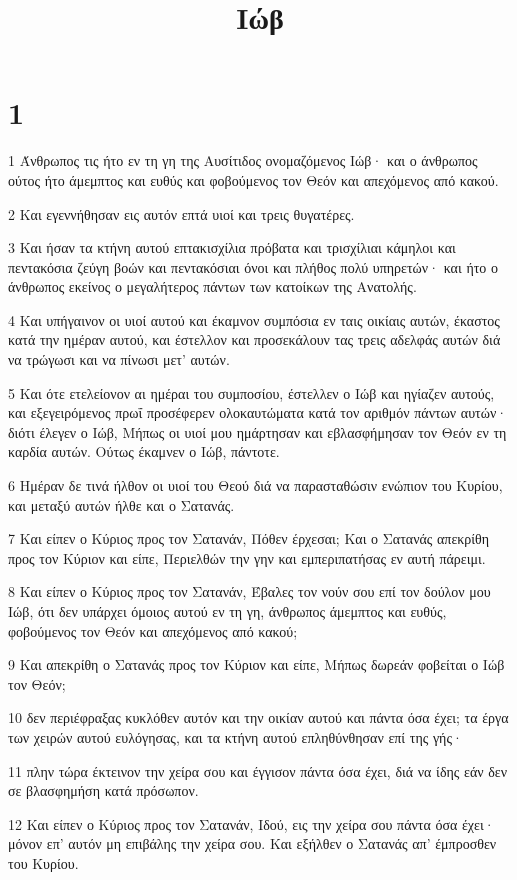 

\title{Ιώβ}


\chapter{1}

\par 1 Άνθρωπος τις ήτο εν τη γη της Αυσίτιδος ονομαζόμενος Ιώβ· και ο άνθρωπος ούτος ήτο άμεμπτος και ευθύς και φοβούμενος τον Θεόν και απεχόμενος από κακού.
\par 2 Και εγεννήθησαν εις αυτόν επτά υιοί και τρεις θυγατέρες.
\par 3 Και ήσαν τα κτήνη αυτού επτακισχίλια πρόβατα και τρισχίλιαι κάμηλοι και πεντακόσια ζεύγη βοών και πεντακόσιαι όνοι και πλήθος πολύ υπηρετών· και ήτο ο άνθρωπος εκείνος ο μεγαλήτερος πάντων των κατοίκων της Ανατολής.
\par 4 Και υπήγαινον οι υιοί αυτού και έκαμνον συμπόσια εν ταις οικίαις αυτών, έκαστος κατά την ημέραν αυτού, και έστελλον και προσεκάλουν τας τρεις αδελφάς αυτών διά να τρώγωσι και να πίνωσι μετ' αυτών.
\par 5 Και ότε ετελείονον αι ημέραι του συμποσίου, έστελλεν ο Ιώβ και ηγίαζεν αυτούς, και εξεγειρόμενος πρωΐ προσέφερεν ολοκαυτώματα κατά τον αριθμόν πάντων αυτών· διότι έλεγεν ο Ιώβ, Μήπως οι υιοί μου ημάρτησαν και εβλασφήμησαν τον Θεόν εν τη καρδία αυτών. Ούτως έκαμνεν ο Ιώβ, πάντοτε.
\par 6 Ημέραν δε τινά ήλθον οι υιοί του Θεού διά να παρασταθώσιν ενώπιον του Κυρίου, και μεταξύ αυτών ήλθε και ο Σατανάς.
\par 7 Και είπεν ο Κύριος προς τον Σατανάν, Πόθεν έρχεσαι; Και ο Σατανάς απεκρίθη προς τον Κύριον και είπε, Περιελθών την γην και εμπεριπατήσας εν αυτή πάρειμι.
\par 8 Και είπεν ο Κύριος προς τον Σατανάν, Έβαλες τον νούν σου επί τον δούλον μου Ιώβ, ότι δεν υπάρχει όμοιος αυτού εν τη γη, άνθρωπος άμεμπτος και ευθύς, φοβούμενος τον Θεόν και απεχόμενος από κακού;
\par 9 Και απεκρίθη ο Σατανάς προς τον Κύριον και είπε, Μήπως δωρεάν φοβείται ο Ιώβ τον Θεόν;
\par 10 δεν περιέφραξας κυκλόθεν αυτόν και την οικίαν αυτού και πάντα όσα έχει; τα έργα των χειρών αυτού ευλόγησας, και τα κτήνη αυτού επληθύνθησαν επί της γής·
\par 11 πλην τώρα έκτεινον την χείρα σου και έγγισον πάντα όσα έχει, διά να ίδης εάν δεν σε βλασφημήση κατά πρόσωπον.
\par 12 Και είπεν ο Κύριος προς τον Σατανάν, Ιδού, εις την χείρα σου πάντα όσα έχει· μόνον επ' αυτόν μη επιβάλης την χείρα σου. Και εξήλθεν ο Σατανάς απ' έμπροσθεν του Κυρίου.
